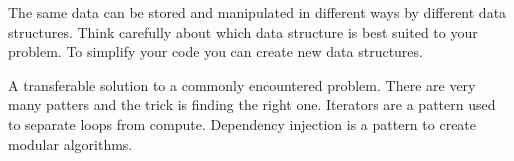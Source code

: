 \documentclass[8pt]{extarticle}
\begin{document}
\begin{bluebox}[title=Data Structures]
  The same data can be stored and manipulated in different ways by different
  data structures. Think carefully about which data structure is best suited to
  your problem. To simplify your code you can create new data structures.
\end{bluebox}

\begin{navybox}[title=Structuring Code]
\end{navybox}

\begin{bluebox}[title=Design Patterns]
  A transferable solution to a commonly encountered problem. There are very many
  patters and the trick is finding the right one. Iterators are a pattern used
  to separate loops from compute. Dependency injection is a pattern to create
  modular algorithms.
\end{bluebox}

\furtherhelp
\end{document}
